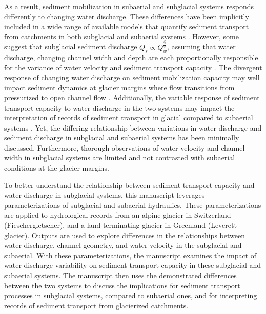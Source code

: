 \documentclass[11pt]{article}
\begin{document}
As a result, sediment mobilization in subaerial and subglacial systems responds differently to changing water discharge.
These differences have been implicitly included in a wide range of available models that  quantify sediment transport from catchments in both subglacial and subaerial systems  \citep[e.g.][]{walder1994,tucker1997,creyts2013,wickert2019,hewitt2019}.
However, some suggest that subglacial sediment discharge  $Q_s \propto Q_w^{\frac{9}{2}}$, assuming that water discharge, changing channel width and depth are each proportionally responsible for the variance of water velocity and sediment transport capacity \citep{alley1997,swift2021}.
The divergent response of changing water discharge on sediment mobilization capacity may well impact sediment dynamics at glacier margins where flow transitions from pressurized to open channel flow \citep[e.g.][]{lane2016,perolo2018}.
Additionally, the variable response of sediment transport capacity to water discharge in the two systems may impact the interpretation of records of sediment transport in glacial compared to subaerial systems \citep[e.g.][]{muller1968,richards2003,ganti2016}.
Yet, the differing relationship between variations in water discharge and sediment discharge in subglacial and subaerial systems has been minimally discussed.
Furthermore, thorough observations of water velocity and channel width in subglacial systems are limited and not contrasted with subaerial conditions at the glacier margins. 

To better understand the relationship between sediment transport capacity and water discharge in subglacial systems, this manuscript leverages parameterizations of subglacial and subaerial hydraulics.
These parameterizations are applied to hydrological records from an alpine glacier in Switzerland (Fieschergletscher), and  a land-terminating glacier in Greenland (Leverett glacier).
Outputs are used to explore differences in the relationships between  water discharge, channel geometry, and water velocity in the subglacial and subaerial. 
With these parameterizations, the manuscript examines the impact of water discharge variability on sediment transport capacity in these subglacial and subaerial systems.
The manuscript then uses the demonstrated differences between the two systems to discuss the implications for sediment transport processes in subglacial systems, compared to subaerial ones, and for interpreting records of sediment transport from glacierized catchments.
\end{document}
